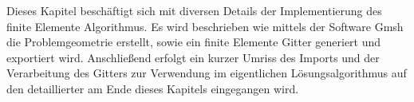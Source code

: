 Dieses Kapitel beschäftigt sich mit diversen Details der Implementierung des finite Elemente Algorithmus. Es wird beschrieben wie mittels der Software Gmsh die Problemgeometrie erstellt, sowie ein finite Elemente Gitter generiert und exportiert wird. Anschließend erfolgt ein kurzer Umriss des Imports und der Verarbeitung des Gitters zur Verwendung im eigentlichen Lösungsalgorithmus auf den detaillierter am Ende dieses Kapitels eingegangen wird.